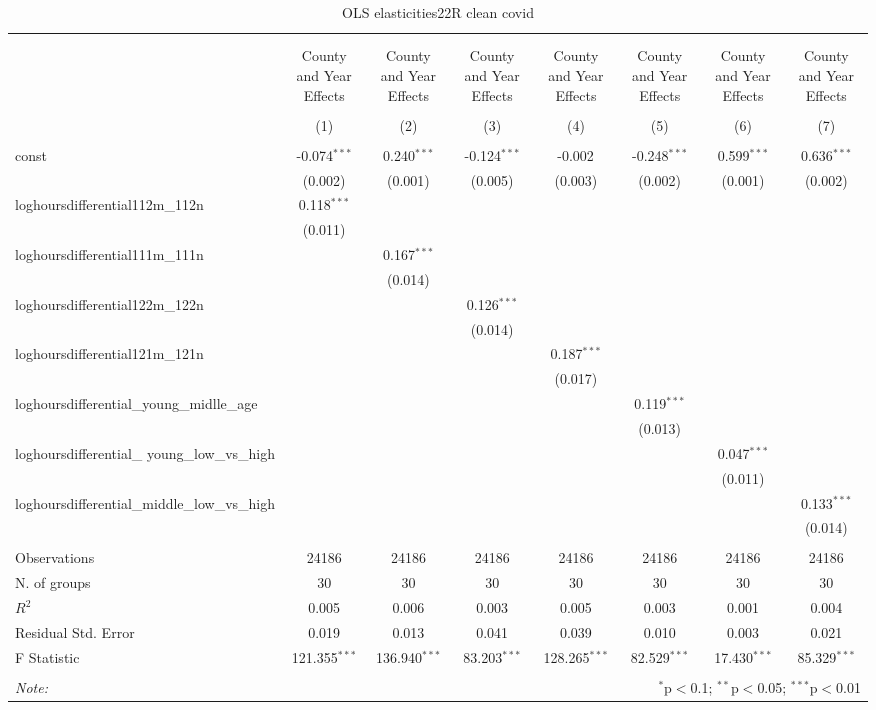\documentclass{report}
\begin{document}
\begin{table}[!htbp] \centering
  \caption{OLS elasticities22R clean covid}
\begin{tabular}{@{\extracolsep{5pt}}lccccccc}
\\[-1.8ex]\hline
\hline \\[-1.8ex]
\\[-1.8ex] & \multicolumn{1}{c}{County and Year Effects} & \multicolumn{1}{c}{County and Year Effects} & \multicolumn{1}{c}{County and Year Effects} & \multicolumn{1}{c}{County and Year Effects} & \multicolumn{1}{c}{County and Year Effects} & \multicolumn{1}{c}{County and Year Effects} & \multicolumn{1}{c}{County and Year Effects}  \\
\\[-1.8ex] & (1) & (2) & (3) & (4) & (5) & (6) & (7) \\
\hline \\[-1.8ex]
 const & -0.074$^{***}$ & 0.240$^{***}$ & -0.124$^{***}$ & -0.002$^{}$ & -0.248$^{***}$ & 0.599$^{***}$ & 0.636$^{***}$ \\
& (0.002) & (0.001) & (0.005) & (0.003) & (0.002) & (0.001) & (0.002) \\
 loghoursdifferential112m_112n & 0.118$^{***}$ & & & & & & \\
& (0.011) & & & & & & \\
 loghoursdifferential111m_111n & & 0.167$^{***}$ & & & & & \\
& & (0.014) & & & & & \\
 loghoursdifferential122m_122n & & & 0.126$^{***}$ & & & & \\
& & & (0.014) & & & & \\
 loghoursdifferential121m_121n & & & & 0.187$^{***}$ & & & \\
& & & & (0.017) & & & \\
 loghoursdifferential_young_midlle_age & & & & & 0.119$^{***}$ & & \\
& & & & & (0.013) & & \\
 loghoursdifferential_ young_low_vs_high & & & & & & 0.047$^{***}$ & \\
& & & & & & (0.011) & \\
 loghoursdifferential_middle_low_vs_high & & & & & & & 0.133$^{***}$ \\
& & & & & & & (0.014) \\
\hline \\[-1.8ex]
 Observations & 24186 & 24186 & 24186 & 24186 & 24186 & 24186 & 24186 \\
 N. of groups & 30 & 30 & 30 & 30 & 30 & 30 & 30 \\
 $R^2$ & 0.005 & 0.006 & 0.003 & 0.005 & 0.003 & 0.001 & 0.004 \\
 Residual Std. Error & 0.019 & 0.013 & 0.041 & 0.039 & 0.010 & 0.003 & 0.021 \\
 F Statistic & 121.355$^{***}$ & 136.940$^{***}$ & 83.203$^{***}$ & 128.265$^{***}$ & 82.529$^{***}$ & 17.430$^{***}$ & 85.329$^{***}$ \\
\hline
\hline \\[-1.8ex]
\textit{Note:} & \multicolumn{7}{r}{$^{*}$p$<$0.1; $^{**}$p$<$0.05; $^{***}$p$<$0.01} \\
\end{tabular}
\end{table}
\end{document}

